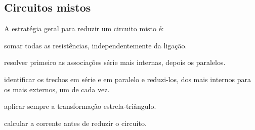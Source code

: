 
\subsection{Circuitos mistos}

\blocofixacao

\begin{questao}[1]{}
A estratégia geral para reduzir um circuito misto é:
\begin{alternativas}
\item somar todas as resistências, independentemente da ligação.
\item resolver primeiro as associações série mais internas, depois os paralelos.
\item identificar os trechos em série e em paralelo e reduzi-los, dos mais internos
      para os mais externos, um de cada vez.
\item aplicar sempre a transformação estrela-triângulo.
\item calcular a corrente antes de reduzir o circuito.
\end{alternativas}
\end{questao}


